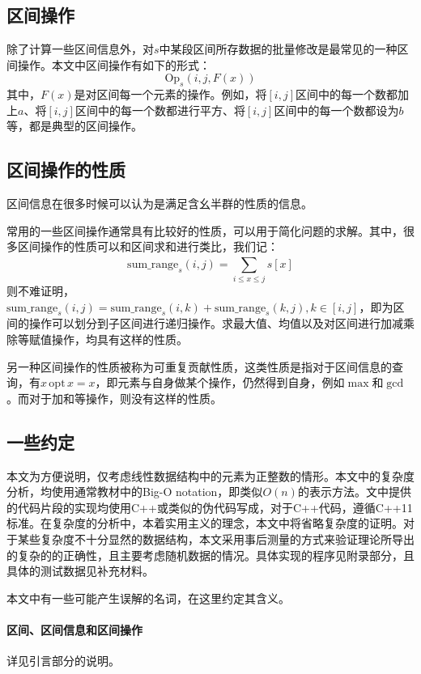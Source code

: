 \documentclass{cjc}
\begin{document}
\subsection{区间操作}

除了计算一些区间信息外，对$s$中某段区间所存数据的批量修改是最常见的一种区间操作。本文中区间操作有如下的形式：
\begin{equation*}
  \text{Op} _s(i,j,F(x))
\end{equation*}
其中，$F(x)$是对区间每一个元素的操作。例如，将$[i,j]$区间中的每一个数都加上$a$、将$[i,j]$区间中的每一个数都进行平方、将$[i,j]$区间中的每一个数都设为$b$等，都是典型的区间操作。

\subsection{区间操作的性质}
区间信息在很多时候可以认为是满足含幺半群的性质的信息。

常用的一些区间操作通常具有比较好的性质，可以用于简化问题的求解。其中，很多区间操作的性质可以和区间求和进行类比，我们记：
\begin{equation*}
  \text{sum\_range} _s(i,j) = \sum_{i\leq x \leq j}^{}s[x]
\end{equation*}
则不难证明，$\text{sum\_range} _s(i,j) = \text{sum\_range} _s(i,k) + \text{sum\_range} _s(k,j), k\in[i,j]$，即为区间的操作可以划分到子区间进行递归操作。求最大值、均值以及对区间进行加减乘除等赋值操作，均具有这样的性质。

另一种区间操作的性质被称为可重复贡献性质，这类性质是指对于区间信息的查询，有$x\, \text{opt}\, x = x$，即元素与自身做某个操作，仍然得到自身，例如$\max$和$\gcd$。而对于加和等操作，则没有这样的性质。

\subsection{一些约定}

本文为方便说明，仅考虑线性数据结构中的元素为正整数的情形。本文中的复杂度分析，均使用通常教材中的Big-O notation，即类似$O(n)$的表示方法。文中提供的代码片段的实现均使用C++或类似的伪代码写成，对于C++代码，遵循C++11标准。在复杂度的分析中，本着实用主义的理念，本文中将省略复杂度的证明。对于某些复杂度不十分显然的数据结构，本文采用事后测量的方式来验证理论所导出的复杂的的正确性，且主要考虑随机数据的情况。具体实现的程序见附录部分，且具体的测试数据见补充材料。

本文中有一些可能产生误解的名词，在这里约定其含义。

\paragraph{区间、区间信息和区间操作} 详见引言部分的说明。
\end{document}
